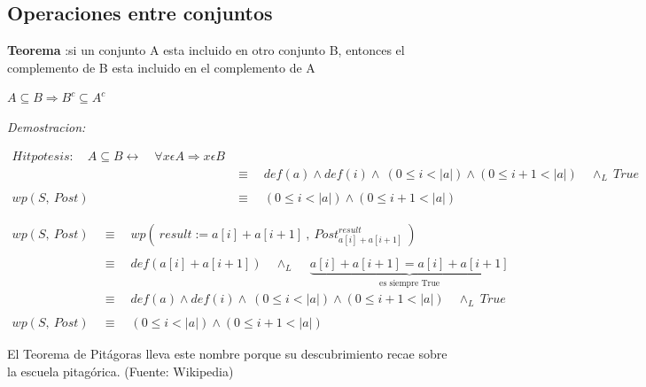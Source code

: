 \documentclass[12pt]{book}
\begin{document}
\subsection{Operaciones entre conjuntos}

\begin{shaded}
\textbf{Teorema }:si un conjunto A esta incluido en otro conjunto B, entonces el complemento de B esta incluido en el complemento de A
\end{shaded}
\begin{center}$ A\subseteq B \Rightarrow  B^{c} \subseteq A^{c}$\end{center}


\textit{Demostracion:}

\begin{equation*}
\begin{split}
Hitpotesis:   \quad  A \subseteq B \longleftrightarrow \quad \forall x \epsilon A \Rightarrow x \epsilon B  \\
&\equiv  \quad  def( a) \wedge def(i) \wedge \ ( 0 \leq i < \vert a \vert ) \wedge (0 \leq i+1 < \vert a \vert ) \quad      \wedge_{L} \ True  \\ \\
wp(S, \ Post) \ &\equiv  \quad  ( 0 \leq i < \vert a \vert ) \wedge (0 \leq i+1 < \vert a \vert )
\end{split}
\end{equation*}

\begin{equation*}
\begin{split}
wp(S, \ Post) \  &\equiv \quad wp ( \ result  := a[i] + a[i+1] \ , \ Post^{result}_{a[i] + a[i+1]} \ )  \\ \\
&\equiv  \quad  def( a[i] + a[i+1]) \quad \wedge_{L} \quad \ \underbrace{a[i] + a[i+1] = a[i] + a[i+1]}_{\text{es siempre True}}  \\
&\equiv  \quad  def( a) \wedge def(i) \wedge \ ( 0 \leq i < \vert a \vert ) \wedge (0 \leq i+1 < \vert a \vert ) \quad      \wedge_{L} \ True  \\ \\
wp(S, \ Post) \ &\equiv  \quad  ( 0 \leq i < \vert a \vert ) \wedge (0 \leq i+1 < \vert a \vert )
\end{split}
\end{equation*}

El Teorema de Pitágoras lleva este nombre porque su descubrimiento recae sobre la escuela pitagórica. (Fuente: Wikipedia)
\end{document}
